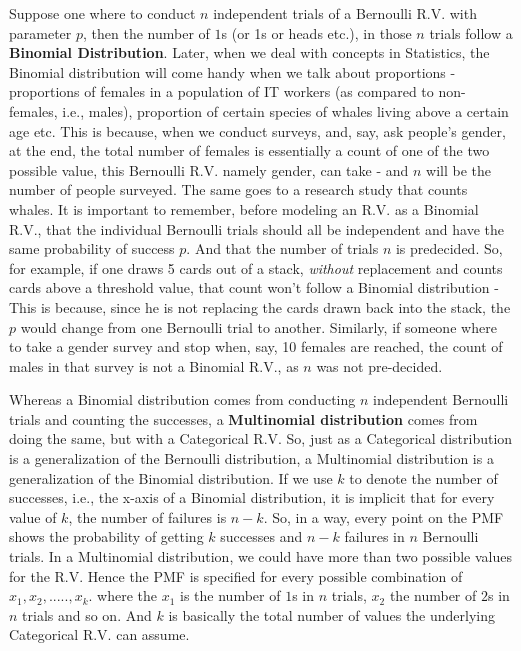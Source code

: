 Suppose one where to conduct $n$ independent trials of a Bernoulli R.V. with parameter $p$, then the number of $1$s (or 1s or heads etc.), in those $n$ trials follow a \textbf{Binomial Distribution}. Later, when we deal with concepts in Statistics, the Binomial distribution will come handy when we talk about proportions - proportions of females in a population of IT workers (as compared to non-females, i.e., males), proportion of certain species of whales living above a certain age etc. This is because, when we conduct surveys, and, say, ask people's gender, at the end, the total number of females is essentially a count of one of the two possible value, this Bernoulli R.V. namely gender, can take - and $n$ will be the number of people surveyed. The same goes to a research study that counts whales. It is important to remember, before modeling an R.V. as a Binomial R.V., that the individual Bernoulli trials should all be independent and have the same probability of success $p$. And that the number of trials $n$ is predecided. So, for example, if one draws 5 cards out of a stack, \emph{without} replacement and counts cards above a threshold value, that count won't follow a Binomial distribution - This is because, since he is not replacing the cards drawn back into the stack, the $p$ would change from one Bernoulli trial to another. Similarly, if someone where to take a gender survey and stop when, say, 10 females are reached, the count of males in that survey is not a Binomial R.V., as $n$ was not pre-decided. 

Whereas a Binomial distribution comes from conducting $n$ independent Bernoulli trials and counting the successes, a \textbf{Multinomial distribution} comes from doing the same, but with a Categorical R.V. So, just as a Categorical distribution is a generalization of the Bernoulli distribution, a Multinomial distribution is a generalization of the Binomial distribution. If we use $k$ to denote the number of successes, i.e., the x-axis of a Binomial distribution, it is implicit that for every value of $k$, the number of failures is $n-k$. So, in a way, every point on the PMF shows the probability of getting $k$ successes and $n-k$ failures in $n$ Bernoulli trials. In a Multinomial distribution, we could have more than two possible values for the R.V. Hence the PMF is specified for every possible combination of $x_1, x_2, ....., x_k$. where the $x_1$ is the number of $1$s in $n$ trials, $x_2$ the number of $2$s in $n$ trials and so on. And $k$ is basically the total number of values the underlying Categorical R.V. can assume.

